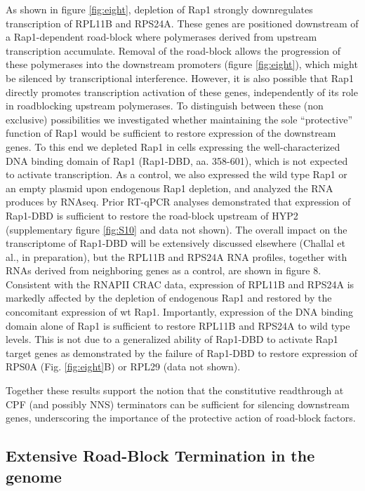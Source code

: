 As shown in figure \ref{fig:eight}, depletion of Rap1 strongly downregulates transcription of RPL11B and RPS24A. These genes are positioned downstream of a Rap1-dependent road-block where polymerases derived from upstream transcription accumulate. Removal of the road-block allows the progression of these polymerases into the downstream promoters (figure \ref{fig:eight}), which  might be silenced by transcriptional interference. However, it is also possible that Rap1 directly promotes transcription activation of these genes, independently of its role in roadblocking upstream polymerases. To distinguish between these (non exclusive) possibilities we investigated whether maintaining the sole “protective” function of Rap1 would be sufficient to restore expression of the downstream genes. To this end we depleted Rap1 in cells expressing the well-characterized DNA binding domain of Rap1 (Rap1-DBD, aa. 358-601), which is not expected to activate transcription. As a control, we also expressed the wild type Rap1 or an empty plasmid upon endogenous Rap1 depletion, and analyzed the RNA produces by RNAseq. Prior RT-qPCR analyses demonstrated that expression of Rap1-DBD is sufficient to restore the road-block upstream of HYP2 (supplementary figure \ref{fig:S10} and data not shown). The overall impact on the transcriptome of Rap1-DBD will be extensively discussed elsewhere (Challal et al., in preparation), but the RPL11B and RPS24A RNA profiles, together with RNAs derived from neighboring genes as a control, are shown in figure 8. Consistent with the RNAPII CRAC data, expression of RPL11B and RPS24A is markedly affected by the depletion of endogenous Rap1 and restored by the concomitant expression of wt Rap1. Importantly, expression of the DNA binding domain alone of Rap1 is sufficient to restore RPL11B and RPS24A to wild type levels. This is not due to a generalized ability of Rap1-DBD to activate Rap1 target genes as demonstrated by the failure of Rap1-DBD to restore expression of RPS0A (Fig. \ref{fig:eight}B) or RPL29 (data not shown).


Together these results support the notion that the constitutive readthrough at CPF (and possibly NNS) terminators can be sufficient for silencing downstream genes, underscoring the importance of the protective action of road-block factors.  

\singlespacing
\subsection*{Extensive Road-Block Termination in the \cer{} genome}
\doublespacing



